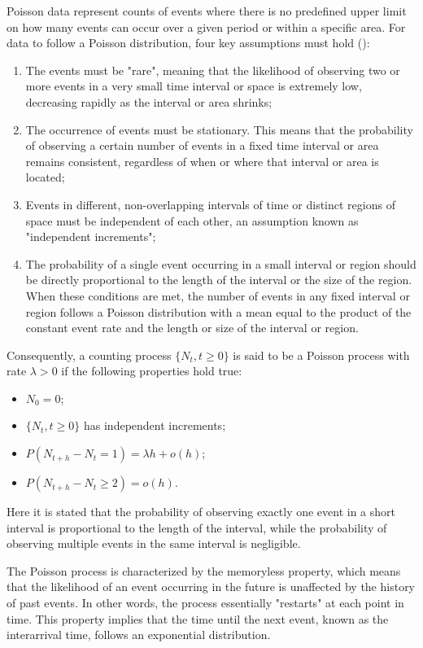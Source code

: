 \documentclass{report}
\begin{document}
Poisson data represent counts of events where there is no predefined upper limit on how many events can occur over a given period or within a specific area. For data to follow a Poisson distribution, four key assumptions must hold (\citet{rosner2021bayesian}):

\begin{enumerate}
	\item  The events must be "rare", meaning that the likelihood of observing two or more events in a very small time interval or space is extremely low, decreasing rapidly as the interval or area shrinks;
	\item The occurrence of events must be stationary. This means that the probability of observing a certain number of events in a fixed time interval or area remains consistent, regardless of when or where that interval or area is located;
	\item Events in different, non-overlapping intervals of time or distinct regions of space must be independent of each other, an assumption known as "independent increments";
	\item The probability of a single event occurring in a small interval or region should be directly proportional to the length of the interval or the size of the region. When these conditions are met, the number of events in any fixed interval or region follows a Poisson distribution with a mean equal to the product of the constant event rate and the length or size of the interval or region.
\end{enumerate}

Consequently, a counting process $\{N_t, t \geq 0\}$ is said to be a Poisson process with rate $\lambda > 0$ if the following properties hold true:

\begin{itemize}
	\item $N_0 = 0$;
	\item $\{N_t, t \geq 0 \}$ has independent increments;
	\item $P(N_{t+h}-N_t = 1) = \lambda h + o(h)$;
	\item $P(N_{t+h}-N_t \geq 2) = o(h)$.
\end{itemize}

Here it is stated that the probability of observing exactly one event in a short interval is proportional to the length of the interval, while the probability of observing multiple events in the same interval is negligible.

The Poisson process is characterized by the memoryless property, which means that the likelihood of an event occurring in the future is unaffected by the history of past events. In other words, the process essentially "restarts" at each point in time. This property implies that the time until the next event, known as the interarrival time, follows an exponential distribution.
\end{document}
